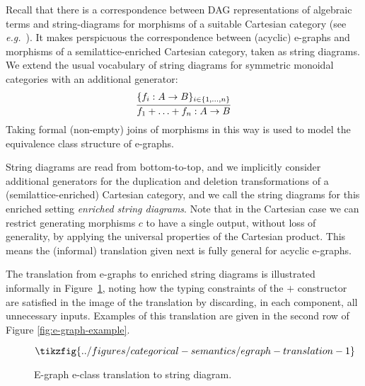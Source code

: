 Recall that there is a correspondence between DAG representations of algebraic terms and  string-diagrams for morphisms of a suitable Cartesian category (see \textit{e.g.}~\cite{ghica-zanassi2023string}).
It makes perspicuous the correspondence between (acyclic) e-graphs and morphisms of a semilattice-enriched Cartesian category, taken as string diagrams.
We extend the usual vocabulary of string diagrams for symmetric monoidal categories with an additional generator:
\[
\infer{f_1 + \ldots + f_n: A \to B}{\{f_i: A \to B\}_{i \in \{1,\ldots,n\}}}
\]
Taking formal (non-empty) joins of morphisms in this way is used to model the equivalence class structure of e-graphs.

String diagrams are read from bottom-to-top, and we implicitly consider additional generators for the duplication and deletion transformations of a (semilattice-enriched) Cartesian category, and we call the string diagrams for this enriched setting \emph{enriched string diagrams}.
Note that in the Cartesian case we can restrict generating morphisms $c$ to have a single output,  without loss of generality,  by applying the universal properties of the Cartesian product.  
This means the (informal) translation given next is fully general for acyclic e-graphs. 

The translation from e-graphs to enriched string diagrams is illustrated informally in Figure~\ref{fig:e-graph-to-string},
noting how the typing constraints of the $+$ constructor are satisfied in the image of the translation by discarding, in each component, all unnecessary inputs.
Examples of this translation are given in the second row of Figure \ref{fig:e-graph-example}.

\begin{figure}
\[
    \tikzfig{../figures/categorical-semantics/egraph-translation-1}
\]
\captionsetup{skip=0pt}
\caption{E-graph e-class translation to string diagram.}
\label{fig:e-graph-to-string}
\end{figure}

